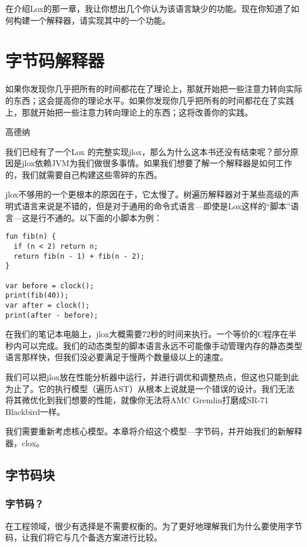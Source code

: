 \documentclass[cn,11pt,chinese]{elegantbook}
\begin{document}
   在介绍Lox的那一章，我让你想出几个你认为该语言缺少的功能。现在你知道了如何构建一个解释器，请实现其中的一个功能。



\part{字节码解释器}

\epigraph{如果你发现你几乎把所有的时间都花在了理论上，那就开始把一些注意力转向实际的东西；这会提高你的理论水平。如果你发现你几乎把所有的时间都花在了实践上，那就开始把一些注意力转向理论上的东西；这将改善你的实践。}{高德纳}

我们已经有了一个Lox 的完整实现jlox，那么为什么这本书还没有结束呢？部分原因是jlox依赖JVM为我们做很多事情。如果我们想要了解一个解释器是如何工作的，我们就需要自己构建这些零碎的东西。

jlox不够用的一个更根本的原因在于，它太慢了。树遍历解释器对于某些高级的声明式语言来说是不错的，但是对于通用的命令式语言—即使是Lox这样的“脚本”语言—这是行不通的。以下面的小脚本为例：

\begin{verbatim}
fun fib(n) {
  if (n < 2) return n;
  return fib(n - 1) + fib(n - 2); 
}

var before = clock();
print(fib(40));
var after = clock();
print(after - before);
\end{verbatim}

在我们的笔记本电脑上，jlox大概需要72秒的时间来执行。一个等价的C程序在半秒内可以完成。我们的动态类型的脚本语言永远不可能像手动管理内存的静态类型语言那样快，但我们没必要满足于慢两个数量级以上的速度。

我们可以把jlox放在性能分析器中运行，并进行调优和调整热点，但这也只能到此为止了。它的执行模型（遍历AST）从根本上说就是一个错误的设计。我们无法将其微优化到我们想要的性能，就像你无法将AMC Gremlin打磨成SR-71 Blackbird一样。

我们需要重新考虑核心模型。本章将介绍这个模型—字节码，并开始我们的新解释器，clox。

\chapter{字节码块}

\section{字节码？}

在工程领域，很少有选择是不需要权衡的。为了更好地理解我们为什么要使用字节码，让我们将它与几个备选方案进行比较。
\end{document}
